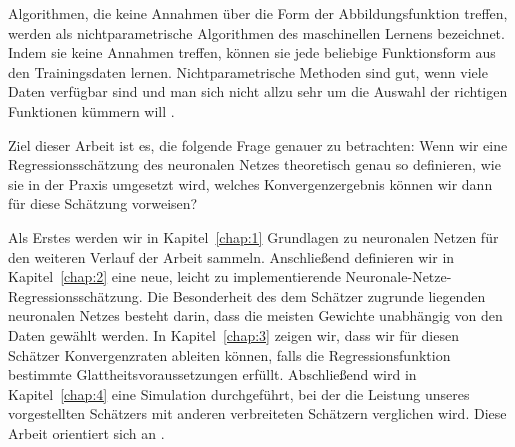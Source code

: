 Algorithmen, die keine Annahmen über die Form der Abbildungsfunktion treffen, werden als nichtparametrische Algorithmen des maschinellen Lernens bezeichnet. Indem sie keine Annahmen treffen, können sie jede beliebige Funktionsform aus den Trainingsdaten lernen.
Nichtparametrische Methoden sind gut, wenn viele Daten verfügbar sind und man sich nicht allzu sehr um die Auswahl der richtigen Funktionen kümmern will \cite[Seite 757]{AI}.

Ziel dieser Arbeit ist es, die folgende Frage genauer zu betrachten: Wenn wir eine Regressionsschätzung des neuronalen Netzes theoretisch genau so definieren, wie sie in der Praxis umgesetzt wird, welches Konvergenzergebnis können wir dann für diese Schätzung vorweisen? 

Als Erstes werden wir in Kapitel~\ref{chap:1} Grundlagen zu neuronalen Netzen für den weiteren Verlauf der Arbeit sammeln.
Anschließend definieren wir in Kapitel~\ref{chap:2} eine neue, leicht zu implementierende Neuronale-Netze-Regressionsschätzung. Die Besonderheit des dem Schätzer zugrunde liegenden neuronalen Netzes besteht darin, dass die meisten Gewichte unabhängig von den Daten gewählt werden.
In Kapitel~\ref{chap:3} zeigen wir, dass wir für diesen Schätzer Konvergenzraten ableiten können, falls die Regressionsfunktion bestimmte Glattheitsvoraussetzungen erfüllt. 
Abschließend wird in Kapitel~\ref{chap:4} eine Simulation durchgeführt, bei der die Leistung unseres vorgestellten Schätzers mit anderen verbreiteten Schätzern verglichen wird. Diese Arbeit orientiert sich an \cite{kohler19}.

